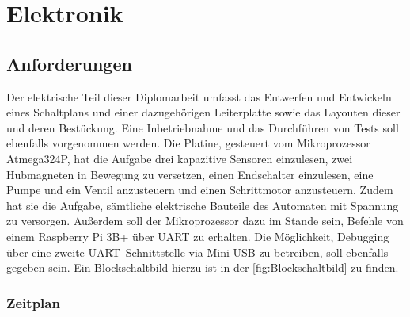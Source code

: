 \chapter{Elektronik}

\section{Anforderungen}

Der elektrische Teil dieser Diplomarbeit umfasst das Entwerfen und Entwickeln eines Schaltplans und einer dazugehörigen Leiterplatte sowie das Layouten dieser und deren Bestückung.
Eine Inbetriebnahme und das Durchführen von Tests soll ebenfalls vorgenommen werden.
Die Platine, gesteuert vom Mikroprozessor Atmega324P, hat die Aufgabe drei kapazitive Sensoren einzulesen,
zwei Hubmagneten in Bewegung zu versetzen, einen Endschalter einzulesen, eine Pumpe und ein Ventil anzusteuern und einen Schrittmotor anzusteuern.
Zudem hat sie die Aufgabe, sämtliche elektrische Bauteile des Automaten mit Spannung zu versorgen.
Außerdem soll der Mikroprozessor dazu im Stande sein, Befehle von einem Raspberry Pi 3B+ über \acs{UART} zu erhalten.
Die Möglichkeit, Debugging über eine zweite UART–Schnittstelle via Mini-\acs{USB} zu betreiben, soll ebenfalls gegeben sein.
Ein Blockschaltbild hierzu ist in der \autoref{fig:Blockschaltbild} zu finden.

\subsection{Zeitplan}

